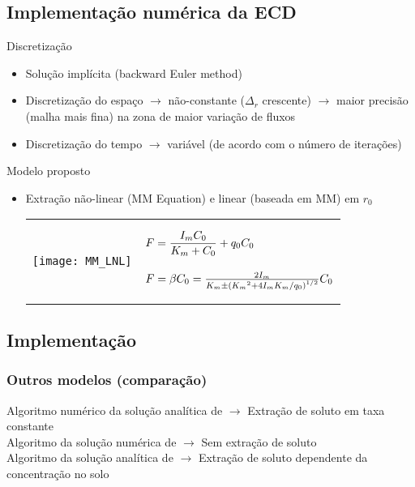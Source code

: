 \subsection{Implementação numérica da ECD}
\begin{frame}
  \begin{block}{Discretização}
  \begin{itemize}
    \item Solução implícita (backward Euler method)
    \item Discretização do espaço $\rightarrow$ não-constante ($\Delta_r$ crescente) $\rightarrow$ maior precisão (malha mais fina) na zona de maior variação de fluxos
    \item Discretização do tempo $\rightarrow$ variável (de acordo com o número de iterações)
  \end{itemize}
  \end{block} \pause
  
  \begin{block}{Modelo proposto}
    \begin{itemize}
      \item Extração não-linear (MM Equation) e linear (baseada em MM) em $r_0$\\
	\begin{tabular}{ll}
	  \multirow{8}{*}{\texttt{[image: MM\_LNL]}} & \\
								  & \\
								  & $F = \displaystyle{I_m C_0 \over K_m + C_0} + q_0 C_0 $ \\
								  & \\
								  & \\
								  & $F = \beta C_0 = {2 I_m \over K_m \pm \left( {K_m}^2 + 4{I_m K_m / q_0} \right)^{1/2}} C_0 $ \\
								  & \\
								  & \\
	\end{tabular}
    \end{itemize}
  \end{block}
\end{frame}

\subsection{Implementação}
\begin{frame}\frametitle{Outros modelos (comparação)}
  Algoritmo numérico da solução analítica de \cite{willigen1} $\rightarrow$ Extração de soluto em taxa constante \\[0.5cm]

  Algoritmo da solução numérica de \cite{liersolute} $\rightarrow$ Sem extração de soluto\\[.5cm]

  Algoritmo da solução analítica de \cite{cushman} $\rightarrow$ Extração de soluto dependente da concentração no solo

\end{frame}

